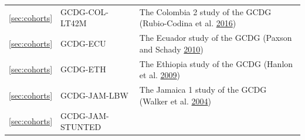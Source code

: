 \documentclass[
]{book}
\begin{document}
\begin{longtable}[]{@{}lll@{}}
\begin{minipage}[t]{0.12\columnwidth}
\ref{sec:cohorts}\strut
\end{minipage} & \begin{minipage}[t]{0.19\columnwidth}\raggedright
GCDG-COL-LT42M\strut
\end{minipage} & \begin{minipage}[t]{0.61\columnwidth}\raggedright
The Colombia 2 study of the GCDG (Rubio-Codina et al. \protect\hyperlink{ref-Rubio-Codina2016}{2016})\strut
\end{minipage}\tabularnewline
\begin{minipage}[t]{0.12\columnwidth}\raggedright
\ref{sec:cohorts}\strut
\end{minipage} & \begin{minipage}[t]{0.19\columnwidth}\raggedright
GCDG-ECU\strut
\end{minipage} & \begin{minipage}[t]{0.61\columnwidth}\raggedright
The Ecuador study of the GCDG (Paxson and Schady \protect\hyperlink{ref-Paxson2010}{2010})\strut
\end{minipage}\tabularnewline
\begin{minipage}[t]{0.12\columnwidth}\raggedright
\ref{sec:cohorts}\strut
\end{minipage} & \begin{minipage}[t]{0.19\columnwidth}\raggedright
GCDG-ETH\strut
\end{minipage} & \begin{minipage}[t]{0.61\columnwidth}\raggedright
The Ethiopia study of the GCDG (Hanlon et al. \protect\hyperlink{ref-Hanlon2009}{2009})\strut
\end{minipage}\tabularnewline
\begin{minipage}[t]{0.12\columnwidth}\raggedright
\ref{sec:cohorts}\strut
\end{minipage} & \begin{minipage}[t]{0.19\columnwidth}\raggedright
GCDG-JAM-LBW\strut
\end{minipage} & \begin{minipage}[t]{0.61\columnwidth}\raggedright
The Jamaica 1 study of the GCDG (Walker et al. \protect\hyperlink{ref-Walker2004}{2004})\strut
\end{minipage}\tabularnewline
\begin{minipage}[t]{0.12\columnwidth}\raggedright
\ref{sec:cohorts}\strut
\end{minipage} & \begin{minipage}[t]{0.19\columnwidth}\raggedright
GCDG-JAM-STUNTED\strut
\end{minipage} & \begin{minipage}[t]{0.61\columnwidth}\raggedright

\end{minipage}
\end{longtable}
\end{document}
